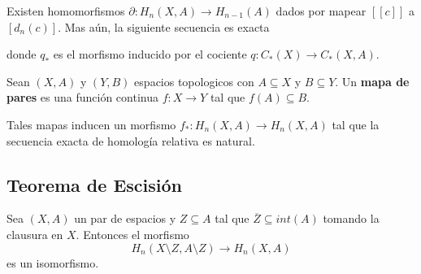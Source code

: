 \documentclass{article}
\begin{document}
\begin{teo}
    Existen homomorfismos $\partial:H_{n}(X,A)\to H_{n-1}(A)$ dados por mapear $\left[[c]\right]$
    a $[d_{n}(c)]$. Mas aún, la siguiente secuencia es exacta
    
    \vspace{2mm}
    \centerline{
    }
    \vspace{2mm}
    donde $q_{*}$ es el morfismo inducido por el cociente $q:C_{*}(X)\to C_{*}(X,A)$.
\end{teo}

\begin{dfn}
    Sean $(X,A)$ y $(Y,B)$ espacios topologicos con $A\subseteq X$ y $B\subseteq Y$. Un \textbf{
    mapa de pares} es una función continua $f:X\to Y$ tal que $f(A)\subseteq B$.
\end{dfn}

\vspace{2mm}
\noindent Tales mapas inducen un morfismo $f_{*}:H_{n}(X,A)\to H_{n}(X,A)$ tal que la secuencia 
exacta de homología relativa es natural.

\subsection{Teorema de Escisión}
\begin{teo}
    Sea $(X,A)$ un par de espacios y $Z\subseteq A$ tal que $\overline{Z}\subseteq int(A)$ tomando
    la clausura en $X$. Entonces el morfismo
    \begin{equation*}
        H_{n}(X\setminus Z,A\setminus Z)\to H_{n}(X,A)
    \end{equation*}
    es un isomorfismo.
\end{teo}

\end{document}
